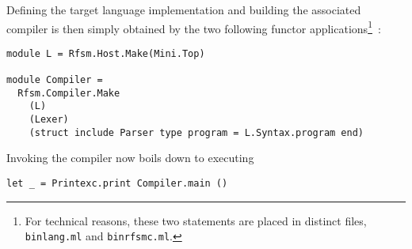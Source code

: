Defining the target language implementation and building the associated compiler is then simply
obtained by the two following functor applications\footnote{For technical reasons, these two
  statements are placed in distinct files, \texttt{bin\/lang.ml} and \texttt{bin\/rfsmc.ml}.}~:

\begin{lstlisting}[language={[Objective]caml},frame=single,basicstyle=\small]
module L = Rfsm.Host.Make(Mini.Top)

module Compiler =
  Rfsm.Compiler.Make
    (L)
    (Lexer)
    (struct include Parser type program = L.Syntax.program end)
\end{lstlisting}

Invoking the compiler now boils down to executing

\begin{lstlisting}[language={[Objective]caml},frame=single,basicstyle=\small]
let _ = Printexc.print Compiler.main ()
\end{lstlisting}

